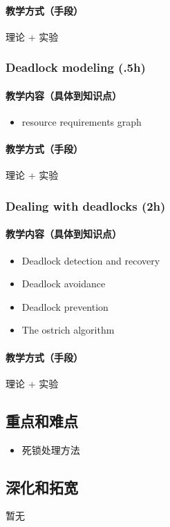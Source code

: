 \documentclass[11pt]{article}
\begin{document}
\paragraph{教学方式（手段）}
\label{sec-5-2-2-2}
理论 + 实验
\subsubsection{Deadlock modeling (.5h)}
\label{sec-5-2-3}
\paragraph{教学内容（具体到知识点）}
\label{sec-5-2-3-1}
\begin{itemize}
\item resource requirements graph
\end{itemize}
\paragraph{教学方式（手段）}
\label{sec-5-2-3-2}
理论 + 实验
\subsubsection{Dealing with deadlocks (2h)}
\label{sec-5-2-4}
\paragraph{教学内容（具体到知识点）}
\label{sec-5-2-4-1}
\begin{itemize}
\item Deadlock detection and recovery
\item Deadlock avoidance
\item Deadlock prevention
\item The ostrich algorithm
\end{itemize}
\paragraph{教学方式（手段）}
\label{sec-5-2-4-2}
理论 + 实验
\subsection{重点和难点}
\label{sec-5-3}
\begin{itemize}
\item 死锁处理方法
\end{itemize}
\subsection{深化和拓宽}
\label{sec-5-4}
暂无
\end{document}

